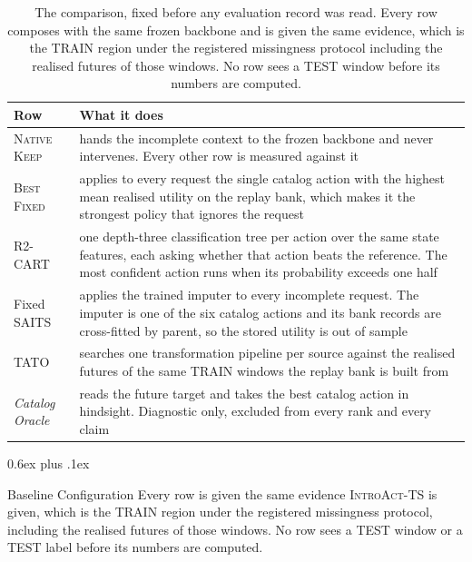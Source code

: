 \documentclass{article}
\makeatletter
\newcommand{\introact}{\textsc{IntroAct-TS}}
\def\subsection{\@startsection{subsection}{2}{\z@}{-1.4ex plus -0.4ex minus -.2ex}%
  {0.6ex plus .1ex}{\normalsize\sc\raggedright}}
\makeatother
\begin{document}
\begin{table}[h]
  \caption{The comparison, fixed before any evaluation record was read. Every row composes with
  the same frozen backbone and is given the same evidence, which is the TRAIN region under the
  registered missingness protocol including the realised futures of those windows. No row sees
  a TEST window before its numbers are computed.}
  \label{tab:app-roster}
  \centering
  \small
  \setlength{\tabcolsep}{4pt}
\begin{tabular}{@{}l p{}@{}}
    \toprule
    Row & What it does \\
    \midrule
    \textsc{Native Keep} & hands the incomplete context to the frozen backbone and never intervenes. Every other row is measured against it \\
    \textsc{Best Fixed} & applies to every request the single catalog action with the highest mean realised utility on the replay bank, which makes it the strongest policy that ignores the request \\
    R2-CART & one depth-three classification tree per action over the same state features, each asking whether that action beats the reference. The most confident action runs when its probability exceeds one half \\
    Fixed SAITS & applies the trained imputer to every incomplete request. The imputer is one of the six catalog actions and its bank records are cross-fitted by parent, so the stored utility is out of sample \\
    TATO & searches one transformation pipeline per source against the realised futures of the same TRAIN windows the replay bank is built from \\
    \emph{Catalog Oracle} & reads the future target and takes the best catalog action in hindsight. Diagnostic only, excluded from every rank and every claim \\
    \bottomrule
  \end{tabular}
\end{table}

\subsection{Baseline Configuration}
\label{app:baseline-config}
Every row is given the same evidence \introact{} is given, which is the TRAIN region under
the registered missingness protocol, including the realised futures of those windows. No row
sees a TEST window or a TEST label before its numbers are computed.
\end{document}
